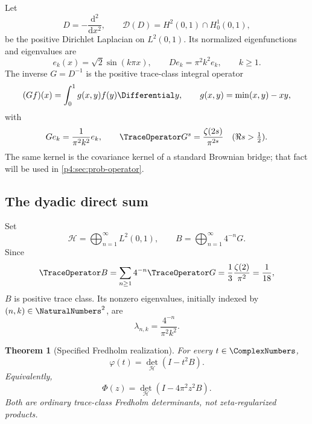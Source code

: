 \documentclass[11pt]{article}
\newtheorem{theorem}{Theorem}[section]
\theoremstyle{definition}
\theoremstyle{remark}
\newcommand{\PhiF}{\Phi}
\newcommand{\phiF}{\varphi}
\begin{document}
Let
\begin{equation}
 D=-\frac{\mathrm d^2}{\mathrm dx^2},
 \qquad
 \mathcal D(D)=H^2(0,1)\cap H_0^1(0,1),
 \label{p4:eq:Dirichlet-D}
\end{equation}
be the positive Dirichlet Laplacian on \(L^2(0,1)\).  Its normalized eigenfunctions and
eigenvalues are
\begin{equation}
 e_k(x)=\sqrt2\sin(k\pi x),
 \qquad
 De_k=\pi^2k^2e_k,
 \qquad k\ge1.
 \label{p4:eq:D-spectrum}
\end{equation}
The inverse \(G=D^{-1}\) is the positive trace-class integral operator
\begin{equation}
 (Gf)(x)=\int_0^1g(x,y)f(y)\Differential y,
 \qquad
 g(x,y)=\min(x,y)-xy,
 \label{p4:eq:Green-kernel}
\end{equation}
with
\begin{equation}
 Ge_k=\frac1{\pi^2k^2}e_k,
 \qquad
 \TraceOperator G^s=\frac{\zeta(2s)}{\pi^{2s}}
 \quad(\Re s>\tfrac12).
 \label{p4:eq:G-zeta}
\end{equation}
The same kernel is the covariance kernel of a standard Brownian bridge; that fact will
be used in \cref{p4:sec:prob-operator}.

\subsection{The dyadic direct sum}

Set
\begin{equation}
 \mathscr H=\bigoplus_{n=1}^{\infty}L^2(0,1),
 \qquad
 B=\bigoplus_{n=1}^{\infty}4^{-n}G.
 \label{p4:eq:B-definition}
\end{equation}
Since
\begin{equation}
 \TraceOperator B=\sum_{n\ge1}4^{-n}\TraceOperator G
 =\frac13\frac{\zeta(2)}{\pi^2}=\frac1{18},
 \label{p4:eq:B-trace}
\end{equation}
\(B\) is positive trace class.  Its nonzero eigenvalues, initially indexed by
\((n,k)\in\NaturalNumbers^2\), are
\begin{equation}
 \lambda_{n,k}=\frac{4^{-n}}{\pi^2k^2}.
 \label{p4:eq:B-double-spectrum}
\end{equation}

\begin{theorem}[Specified Fredholm realization]
\label{p4:thm:Fredholm}
For every \(t\in\ComplexNumbers\),
\begin{equation}
 \boxed{\quad
 \phiF(t)=\det_{\mathscr H}(I-t^2B).
 \quad}
 \label{p4:eq:Fredholm-phi}
\end{equation}
Equivalently,
\begin{equation}
 \PhiF(z)=\det_{\mathscr H}(I-4\pi^2z^2B).
 \label{p4:eq:Fredholm-Phi}
\end{equation}
Both are ordinary trace-class Fredholm determinants, not zeta-regularized products.
\end{theorem}
\end{document}
